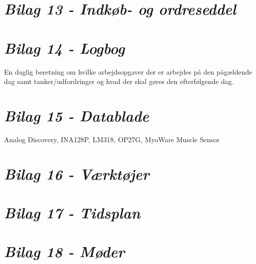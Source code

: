 \section*{\textit{Bilag 13 - Indkøb- og ordreseddel}} \label{bilag13}
\section*{\textit{Bilag 14 - Logbog}} \label{bilag14}
En daglig beretning om hvilke arbejdsopgaver der er arbejdes på den pågældende dag samt tanker/udfordringer og hvad der skal gøres den efterfølgende dag.
\section*{\textit{Bilag 15 - Datablade}} \label{bilag15}
Analog Discovery, INA128P, LM318, OP27G, MyoWare Muscle Sensor
\section*{\textit{Bilag 16 - Værktøjer}} \label{bilag16}
\section*{\textit{Bilag 17 - Tidsplan}} \label{bilag17}
\section*{\textit{Bilag 18 - Møder}} \label{bilag18}







